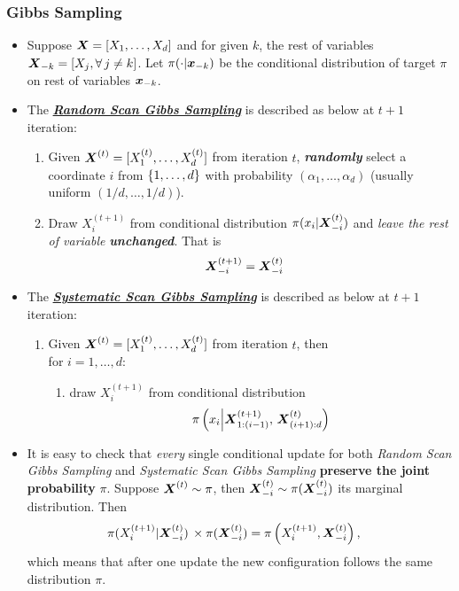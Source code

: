 \documentclass[11pt]{article}
\begin{document}
\subsubsection{Gibbs Sampling}
\begin{itemize}
\item Suppose $\boldsymbol{X} = [X_1, \ldots, X_d]$ and for given $k$, the rest of variables $\boldsymbol{X}_{-k} = [X_j, \forall\,j\neq k]$. Let $\pi(\cdot|\boldsymbol{x}_{-k})$ be the conditional distribution of target $\pi$ on rest of variables $\boldsymbol{x}_{-k}$.

\item The \underline{\emph{\textbf{Random Scan Gibbs Sampling}}} is described as below at $t+1$ iteration:
\begin{enumerate}
\item Given $\boldsymbol{X}^{(t)} = [X_1^{(t)}, \ldots, X_d^{(t)}]$ from iteration $t$, \emph{\textbf{randomly}} select a coordinate $i$ from $\left\{1,\ldots, d\right\}$ with probability $(\alpha_1, \ldots, \alpha_d)$ (usually uniform $(1/d, \ldots, 1/d)$).
\item Draw $X_{i}^{(t+1)}$ from conditional distribution $\pi(x_i|\boldsymbol{X}_{-i}^{(t)})$ and \emph{leave the rest of variable} \emph{\textbf{unchanged}}. That is
\begin{align*}
\boldsymbol{X}_{-i}^{(t+1)} &= \boldsymbol{X}_{-i}^{(t)}
\end{align*}
\end{enumerate}

\item The \underline{\emph{\textbf{Systematic Scan Gibbs Sampling}}} is described as below at $t+1$ iteration:
\begin{enumerate}
\item Given $\boldsymbol{X}^{(t)} = [X_1^{(t)}, \ldots, X_d^{(t)}]$ from iteration $t$, then\\
      for $i=1,\ldots, d$: 
      \begin{enumerate}
      \item draw $X_{i}^{(t+1)}$ from conditional distribution 
      \begin{align*}
      \pi \left(x_i \Big|\boldsymbol{X}_{1:(i-1)}^{(t+1)},\, \boldsymbol{X}_{(i+1):d}^{(t)}\right)
      \end{align*}
      \end{enumerate}
\end{enumerate}

\item It is easy to check that \emph{every} single conditional update for both \emph{Random Scan Gibbs Sampling} and \emph{Systematic Scan Gibbs Sampling} \textbf{preserve the joint probability} $\pi$. Suppose $\boldsymbol{X}^{(t)} \sim \pi$, then $\boldsymbol{X}_{-i}^{(t)} \sim \pi(\boldsymbol{X}_{-i}^{(t)})$ its marginal distribution. Then 
\begin{align*}
\pi(X_{i}^{(t+1)} | \boldsymbol{X}_{-i}^{(t)})\,\times \pi(\boldsymbol{X}_{-i}^{(t)}) &= \pi\left(X_{i}^{(t+1)}, \boldsymbol{X}_{-i}^{(t)}\right),
\end{align*} which means that after one update the new configuration follows the same distribution $\pi$.


\end{itemize}
\end{document}

